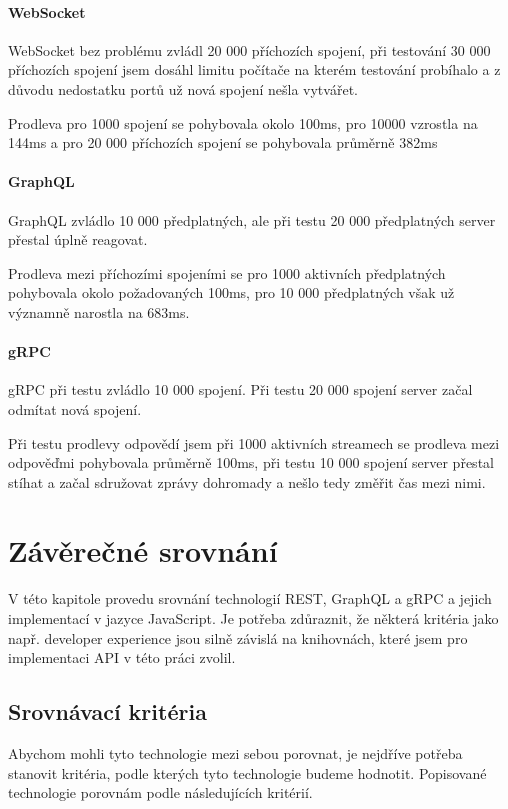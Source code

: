 \documentclass[thesis=M,czech]{FITthesis}[2019/12/23]
\begin{document}
\subsubsection*{WebSocket}
WebSocket bez problému zvládl 20 000 příchozích spojení, při testování 30 000 příchozích spojení jsem dosáhl limitu počítače na kterém testování probíhalo a z důvodu nedostatku portů už nová spojení nešla vytvářet.

Prodleva pro 1000 spojení se pohybovala okolo 100ms, pro 10000 vzrostla na 144ms a pro 20 000 příchozích spojení se pohybovala průměrně 382ms

\subsubsection*{GraphQL}
GraphQL zvládlo 10 000 předplatných, ale při testu 20 000 předplatných server přestal úplně reagovat.

Prodleva mezi příchozími spojeními se pro 1000 aktivních předplatných pohybovala okolo požadovaných 100ms, pro 10 000 předplatných však už významně narostla na 683ms.

\subsubsection*{gRPC}
gRPC při testu zvládlo 10 000 spojení. Při testu 20 000 spojení server začal odmítat nová spojení.

Při testu prodlevy odpovědí jsem při 1000 aktivních streamech se prodleva mezi odpověďmi pohybovala průměrně 100ms, při testu 10 000 spojení server přestal stíhat a začal sdružovat zprávy dohromady a nešlo tedy změřit čas mezi nimi. 

\chapter{Závěrečné srovnání}
V této kapitole provedu srovnání technologií REST, GraphQL a gRPC a jejich implementací v jazyce JavaScript. Je potřeba zdůraznit, že některá kritéria jako např. developer experience jsou silně závislá na knihovnách, které jsem pro implementaci API v této práci zvolil.


\section{Srovnávací kritéria}
Abychom mohli tyto technologie mezi sebou porovnat, je nejdříve potřeba stanovit kritéria, podle kterých tyto technologie budeme hodnotit. Popisované technologie porovnám podle následujících kritérií.
\end{document}
